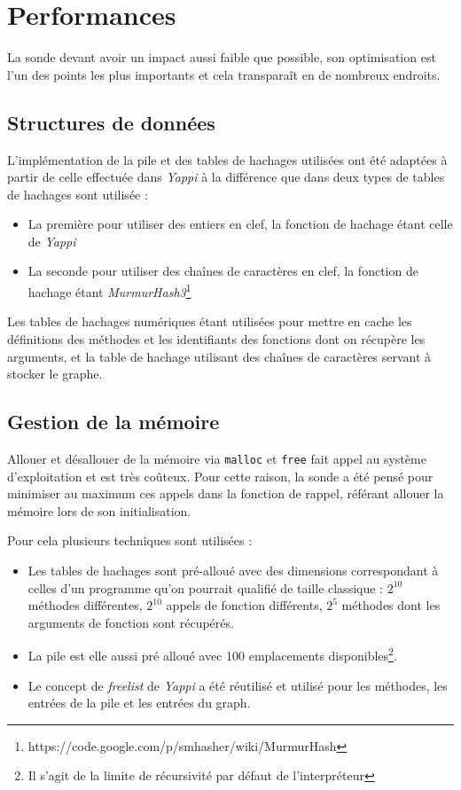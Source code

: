   \section{Performances}
  \label{sec:performances}
      
La sonde devant avoir un impact aussi faible que possible, son optimisation est l'un des points les plus importants et cela transparaît en de nombreux endroits.

\subsection{Structures de données}
L'implémentation de la pile et des tables de hachages utilisées ont été adaptées à partir de celle effectuée dans \emph{Yappi} à la différence que dans \Blackfire deux types de tables de hachages sont utilisée :
\begin{itemize}
\item La première pour utiliser des entiers en clef, la fonction de hachage étant celle de \emph{Yappi}
\item La seconde pour utiliser des chaînes de caractères en clef, la fonction de hachage étant \emph{MurmurHash3}\footnote{https://code.google.com/p/smhasher/wiki/MurmurHash}
\end{itemize}

Les tables de hachages numériques étant utilisées pour mettre en cache les définitions des méthodes et les identifiants des fonctions dont on récupère les arguments, et la table de hachage utilisant des chaînes de caractères servant à stocker le graphe.

\subsection{Gestion de la mémoire}
Allouer et désallouer de la mémoire via \verb|malloc| et \verb|free| fait appel au système d'exploitation et est très coûteux. Pour cette raison, la sonde \Python a été pensé pour minimiser au maximum ces appels dans la fonction de rappel, référant allouer la mémoire lors de son initialisation.

Pour cela plusieurs techniques sont utilisées : 
\begin{itemize}
\item Les tables de hachages sont pré-alloué avec des dimensions correspondant à celles d'un programme qu'on pourrait qualifié de taille classique : $2^{10}$ méthodes différentes, $2^{10}$ appels de fonction différents, $2^5$ méthodes dont les arguments de fonction sont récupérés.
\item La pile est elle aussi pré alloué avec 100 emplacements disponibles\footnote{Il s'agit de la limite de récursivité par défaut de l'interpréteur \Python}.
\item Le concept de \emph{freelist} de \emph{Yappi} a été réutilisé et utilisé pour les méthodes, les entrées de la pile et les entrées du graph.
\end{itemize}

